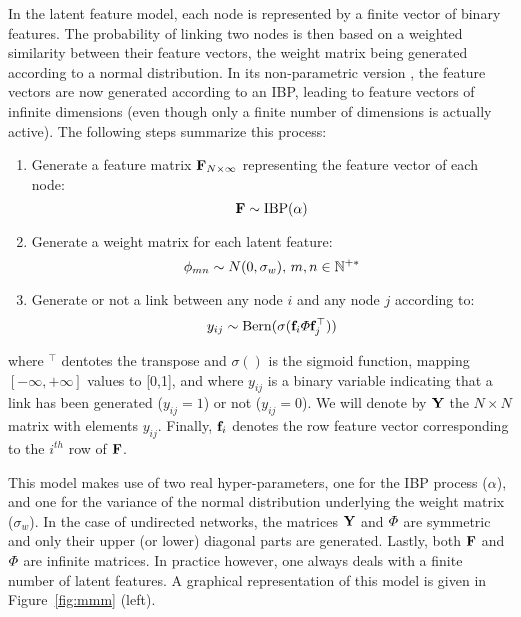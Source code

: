In the latent feature model, each node is represented by a finite vector of binary features. The probability of linking two nodes is then based on a weighted similarity between their feature vectors, the weight matrix being generated according to a normal distribution. In its non-parametric version \ifm, the feature vectors are now generated according to an IBP, leading to feature vectors of infinite dimensions (even though only a finite number of dimensions is actually active). The following steps summarize this process:~\\
%
\begin{enumerate}
    \item Generate a feature matrix $\mathbf{F}_{N \times \infty}$ representing the feature vector of each node: \[\mathbf{F} \sim \mathrm{IBP}(\alpha)\]
\item Generate a weight matrix for each latent feature:\\
    \[\mathbf{\phi}_{mn} \sim N(0, \sigma_w), \, m,n \in \mathbb{N}^{+*}\]
\item Generate or not a link between any node $i$ and any node $j$ according to: 
%
\begin{equation*}
y_{ij} \sim \mathrm{Bern}(\sigma(\mat{f}_{i} \mat{\Phi} \mat{f}_{j}^\top))
\end{equation*}
\end{enumerate}
%
where $^\top$ dentotes the transpose and  $\sigma()$ is the sigmoid function, mapping $[-\infty, +\infty]$ values to [0,1], and where $y_{ij}$ is a binary variable indicating that a link has been generated ($y_{ij}=1$) or not ($y_{ij}=0$). We will denote by $\mathbf{Y}$ the $N \times N$ matrix with elements $y_{ij}$. Finally, $\mathbf{f}_{i}$ denotes the row feature vector corresponding to the $i^{th}$ row of $\mathbf{F}$.

This model makes use of two real hyper-parameters, one for the IBP process ($\alpha$), and one for the variance of the normal distribution underlying the weight matrix ($\sigma_w$). In the case of undirected networks, the matrices $\mathbf{Y}$ and $\mat{\Phi}$ are symmetric and only their upper (or lower) diagonal parts are generated. Lastly, both $\mathbf{F}$ and $\mat{\Phi}$ are infinite matrices. In practice however, one always deals with a finite number of latent features. A graphical representation of this model is given in Figure~\ref{fig:mmm} (left).~\\

